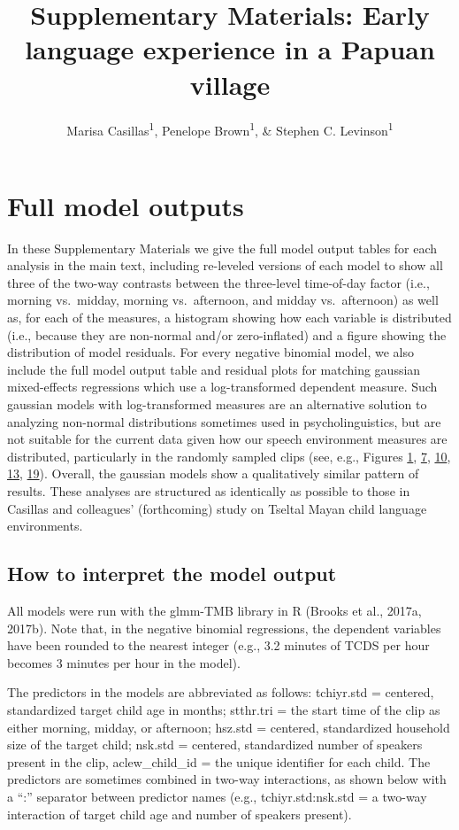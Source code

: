\documentclass[,man,floatsintext]{apa6}
\title{Supplementary Materials: Early language experience in a Papuan village}
\author{Marisa Casillas\textsuperscript{1}, Penelope Brown\textsuperscript{1},
\& Stephen C. Levinson\textsuperscript{1}}
\date{}
\affiliation{
\vspace{0.5cm}
\textsuperscript{1} Max Planck Institute for Psycholinguistics}
\begin{document}
\maketitle

\section{Full model outputs}\label{models}

In these Supplementary Materials we give the full model output tables
for each analysis in the main text, including re-leveled versions of
each model to show all three of the two-way contrasts between the
three-level time-of-day factor (i.e., morning vs.~midday, morning
vs.~afternoon, and midday vs.~afternoon) as well as, for each of the
measures, a histogram showing how each variable is distributed (i.e.,
because they are non-normal and/or zero-inflated) and a figure showing
the distribution of model residuals. For every negative binomial model,
we also include the full model output table and residual plots for
matching gaussian mixed-effects regressions which use a log-transformed
dependent measure. Such gaussian models with log-transformed measures
are an alternative solution to analyzing non-normal distributions
sometimes used in psycholinguistics, but are not suitable for the
current data given how our speech environment measures are distributed,
particularly in the randomly sampled clips (see, e.g., Figures
\protect\hyperlink{fig1}{1}, \protect\hyperlink{fig7}{7},
\protect\hyperlink{fig10}{10}, \protect\hyperlink{fig13}{13},
\protect\hyperlink{fig19}{19}). Overall, the gaussian models show a
qualitatively similar pattern of results. These analyses are structured
as identically as possible to those in Casillas and colleagues'
(forthcoming) study on Tseltal Mayan child language environments.

\subsection{How to interpret the model
output}\label{how-to-interpret-the-model-output}

All models were run with the glmm-TMB library in R (Brooks et al.,
2017a, 2017b). Note that, in the negative binomial regressions, the
dependent variables have been rounded to the nearest integer (e.g., 3.2
minutes of TCDS per hour becomes 3 minutes per hour in the model).

The predictors in the models are abbreviated as follows: tchiyr.std =
centered, standardized target child age in months; stthr.tri = the start
time of the clip as either morning, midday, or afternoon; hsz.std =
centered, standardized household size of the target child; nsk.std =
centered, standardized number of speakers present in the clip,
aclew\_child\_id = the unique identifier for each child. The predictors
are sometimes combined in two-way interactions, as shown below with a
\enquote{:} separator between predictor names (e.g., tchiyr.std:nsk.std
= a two-way interaction of target child age and number of speakers
present).
\end{document}
